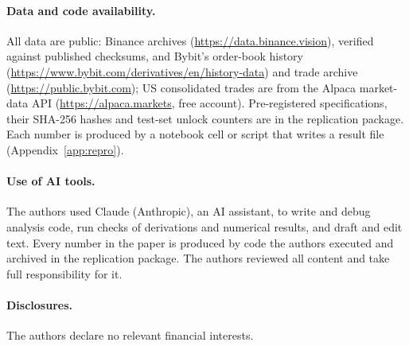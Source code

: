 \paragraph{Data and code availability.} All data are public: Binance archives (\url{https://data.binance.vision}), verified against published checksums, and Bybit's order-book history (\url{https://www.bybit.com/derivatives/en/history-data}) and trade archive (\url{https://public.bybit.com}); US consolidated trades are from the Alpaca market-data API (\url{https://alpaca.markets}, free account). Pre-registered specifications, their SHA-256 hashes and test-set unlock counters are in the replication package. Each number is produced by a notebook cell or script that writes a result file (Appendix~\ref{app:repro}).

\paragraph{Use of AI tools.} The authors used Claude (Anthropic), an AI assistant, to write and debug analysis code, run checks of derivations and numerical results, and draft and edit text. Every number in the paper is produced by code the authors executed and archived in the replication package. The authors reviewed all content and take full responsibility for it.

\paragraph{Disclosures.} The authors declare no relevant financial interests.
